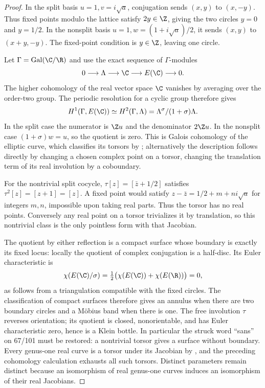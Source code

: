 \begin{proof}
In the split basis $u=1,v=i\sqrt a$, conjugation sends $(x,y)$ to $(x,-y)$. Thus fixed points modulo the lattice satisfy $2y\in\Z$, giving the two circles $y=0$ and $y=1/2$. In the nonsplit basis $u=1,w=(1+i\sqrt a)/2$, it sends $(x,y)$ to $(x+y,-y)$. The fixed-point condition is $y\in\Z$, leaving one circle.

Let $\Gamma=\operatorname{Gal}(\C/\R)$ and use the exact sequence of $\Gamma$-modules
\[
 0\longrightarrow\Lambda\longrightarrow\C\longrightarrow E(\C)
 \longrightarrow0.
\]
The higher cohomology of the real vector space $\C$ vanishes by averaging over the order-two group. The periodic resolution for a cyclic group therefore gives
\[
 H^1(\Gamma,E(\C))\simeq H^2(\Gamma,\Lambda)
 =\Lambda^\sigma/(1+\sigma)\Lambda.
\]
In the split case the numerator is $\Z u$ and the denominator $2\Z u$. In the nonsplit case $(1+\sigma)w=u$, so the quotient is zero. This is Galois cohomology of the elliptic curve, which classifies its torsors by \cite[IV, Theorem 7.8]{MilneEC2021A567}; alternatively the description follows directly by changing a chosen complex point on a torsor, changing the translation term of its real involution by a coboundary.

For the nontrivial split cocycle, $\tau[z]=[\bar{z}+1/2]$ satisfies $\tau^2[z]=[z+1]=[z]$. A fixed point would satisfy $z-\bar{z}=1/2+m+ni\sqrt a$ for integers $m,n$, impossible upon taking real parts. Thus the torsor has no real points. Conversely any real point on a torsor trivializes it by translation, so this nontrivial class is the only pointless form with that Jacobian.

The quotient by either reflection is a compact surface whose boundary is exactly its fixed locus: locally the quotient of complex conjugation is a half-disc. Its Euler characteristic is
\[
 \chi(E(\C)/\sigma)=\tfrac12\bigl(\chi(E(\C))+\chi(E(\R))\bigr)=0,
\]
as follows from a triangulation compatible with the fixed circles. The classification of compact surfaces therefore gives an annulus when there are two boundary circles and a M\"obius band when there is one. The free involution $\tau$ reverses orientation; its quotient is closed, nonorientable, and has Euler characteristic zero, hence is a Klein bottle. In particular the struck word ``sans'' on 67/101 must be restored: a nontrivial torsor gives a surface without boundary. Every genus-one real curve is a torsor under its Jacobian by \cite[IV, Theorem 7.19]{MilneEC2021A567}, and the preceding cohomology calculation exhausts all such torsors. Distinct parameters remain distinct because an isomorphism of real genus-one curves induces an isomorphism of their real Jacobians.
\end{proof}

